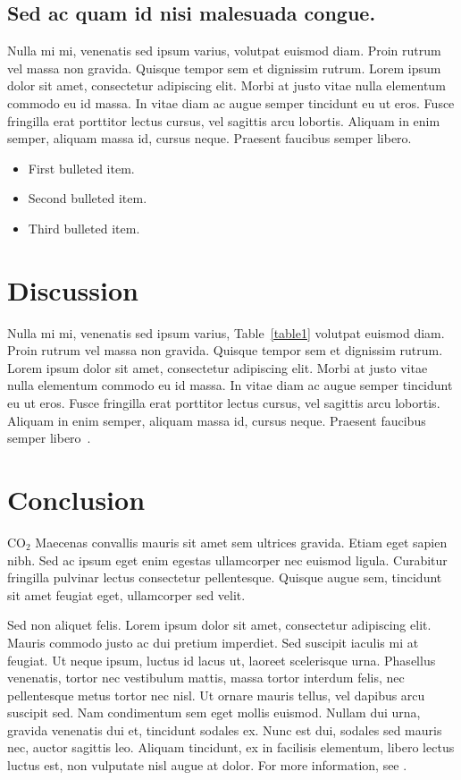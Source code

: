 \documentclass[10pt,letterpaper]{article}
\begin{document}
\subsection*{Sed ac quam id nisi malesuada congue.}

Nulla mi mi, venenatis sed ipsum varius, volutpat euismod diam. Proin rutrum vel massa non gravida. Quisque tempor sem et dignissim rutrum. Lorem ipsum dolor sit amet, consectetur adipiscing elit. Morbi at justo vitae nulla elementum commodo eu id massa. In vitae diam ac augue semper tincidunt eu ut eros. Fusce fringilla erat porttitor lectus cursus, vel sagittis arcu lobortis. Aliquam in enim semper, aliquam massa id, cursus neque. Praesent faucibus semper libero.

\begin{itemize}
	\item First bulleted item.
	\item Second bulleted item.
	\item Third bulleted item.
\end{itemize}

\section*{Discussion}
Nulla mi mi, venenatis sed ipsum varius, Table~\ref{table1} volutpat euismod diam. Proin rutrum vel massa non gravida. Quisque tempor sem et dignissim rutrum. Lorem ipsum dolor sit amet, consectetur adipiscing elit. Morbi at justo vitae nulla elementum commodo eu id massa. In vitae diam ac augue semper tincidunt eu ut eros. Fusce fringilla erat porttitor lectus cursus, vel sagittis arcu lobortis. Aliquam in enim semper, aliquam massa id, cursus neque. Praesent faucibus semper libero~\cite{bib3}.

\section*{Conclusion}

CO$_2$ Maecenas convallis mauris sit amet sem ultrices gravida. Etiam eget sapien nibh. Sed ac ipsum eget enim egestas ullamcorper nec euismod ligula. Curabitur fringilla pulvinar lectus consectetur pellentesque. Quisque augue sem, tincidunt sit amet feugiat eget, ullamcorper sed velit. 

Sed non aliquet felis. Lorem ipsum dolor sit amet, consectetur adipiscing elit. Mauris commodo justo ac dui pretium imperdiet. Sed suscipit iaculis mi at feugiat. Ut neque ipsum, luctus id lacus ut, laoreet scelerisque urna. Phasellus venenatis, tortor nec vestibulum mattis, massa tortor interdum felis, nec pellentesque metus tortor nec nisl. Ut ornare mauris tellus, vel dapibus arcu suscipit sed. Nam condimentum sem eget mollis euismod. Nullam dui urna, gravida venenatis dui et, tincidunt sodales ex. Nunc est dui, sodales sed mauris nec, auctor sagittis leo. Aliquam tincidunt, ex in facilisis elementum, libero lectus luctus est, non vulputate nisl augue at dolor. For more information, see .
\end{document}
